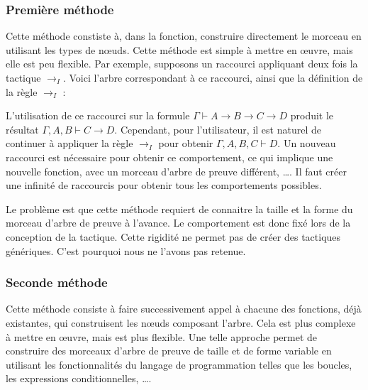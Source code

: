 \documentclass[french,titlepage]{article}
\begin{document}
\subsubsection{Première méthode} \label{realisation:composition_tactiques:premiere_methode}
Cette méthode constiste à, dans la fonction, construire directement le morceau en utilisant les types de nœuds. Cette méthode est simple à mettre en œuvre, mais elle est peu flexible. Par exemple, supposons un raccourci appliquant deux fois la tactique $\to_I$. Voici l'arbre correspondant à ce raccourci, ainsi que la définition de la règle $\to_I$ :

L'utilisation de ce raccourci sur la formule $\Gamma \vdash A \to B \to C \to D$ produit le résultat $\Gamma, A, B \vdash C \to D$. Cependant, pour l'utilisateur, il est naturel de continuer à appliquer la règle $\to_I$ pour obtenir $\Gamma, A, B, C \vdash D$. Un nouveau raccourci est nécessaire pour obtenir ce comportement, ce qui implique une nouvelle fonction, avec un morceau d'arbre de preuve différent, \dots. Il faut créer une infinité de raccourcis pour obtenir tous les comportements possibles.

Le problème est que cette méthode requiert de connaitre la taille et la forme du morceau d'arbre de preuve à l'avance. Le comportement est donc fixé lors de la conception de la tactique. Cette rigidité ne permet pas de créer des tactiques génériques. C'est pourquoi nous ne l'avons pas retenue.

\subsubsection{Seconde méthode} \label{realisation:composition_tactiques:seconde_methode}
Cette méthode consiste à faire successivement appel à chacune des fonctions, déjà existantes, qui construisent les nœuds composant l'arbre. Cela est plus complexe à mettre en œuvre, mais est plus flexible. Une telle approche permet de construire des morceaux d'arbre de preuve de taille et de forme variable en utilisant les fonctionnalités du langage de programmation telles que les boucles, les expressions conditionnelles, \dots.
\end{document}
